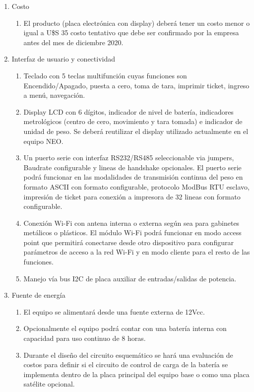 \documentclass[11pt]{charter}
\begin{document}
\begin{enumerate}
\item Costo
	\begin{enumerate}
	\item El producto (placa electrónica con display) deberá tener un costo menor o igual a U\$S 35 \color{red} costo tentativo que debe ser confirmado por la empresa antes del mes de diciembre 2020.
	\end{enumerate}
\item Interfaz de usuario y conectividad
	\begin{enumerate}
	\item Teclado con 5 teclas multifunción cuyas funciones son Encendido/Apagado, puesta a cero, toma de tara, imprimir ticket, ingreso a menú, navegación.
	\item Display LCD con 6 dígitos, indicador de nivel de batería, indicadores metrológicos (centro de cero, movimiento y tara tomada) e indicador de unidad de peso. Se deberá reutilizar el display utilizado actualmente en el equipo NEO.
	\item Un puerto serie con interfaz RS232/RS485 seleccionable via jumpers, Baudrate configurable y lineas de handshake opcionales. El puerto serie podrá funcionar en las modalidades de transmisión continua del peso en formato ASCII con formato configurable, protocolo ModBus RTU esclavo, impresión de ticket para conexión a impresora de 32 lineas con formato configurable. 
	\item Conexión Wi-Fi con antena interna o externa según sea para gabinetes metálicos o plásticos. El módulo Wi-Fi podrá funcionar en modo access point que permitirá conectarse desde otro dispositivo para configurar parámetros de acceso a la red Wi-Fi y en modo cliente para el resto de las funciones.
	\item Manejo vía bus I2C de placa auxiliar de entradas/salidas de potencia.
	\end{enumerate}
\item Fuente de energía
	\begin{enumerate}
	\item El equipo se alimentará desde una fuente externa de 12Vcc.
	\item Opcionalmente el equipo podrá contar con una batería interna con capacidad para uso continuo de 8 horas.
	\item Durante el diseño del circuito esquemático se hará una evaluación de costos para definir si el circuito de control de carga de la batería se implementa dentro de la placa principal del equipo base o como una placa satélite opcional. 

\end{enumerate}
\end{enumerate}
\end{document}
